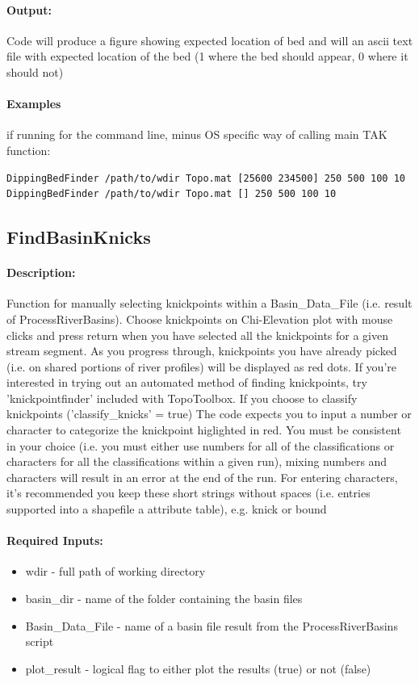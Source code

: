 \paragraph{Output:}
Code will produce a figure showing expected location of bed and will an ascii text file with expected location of the bed 
(1 where the bed should appear, 0 where it should not)

\paragraph{Examples} if running for the command line, minus OS specific way of calling main TAK function:
\begin{lstlisting}[language=bash]
DippingBedFinder /path/to/wdir Topo.mat [25600 234500] 250 500 100 10
DippingBedFinder /path/to/wdir Topo.mat [] 250 500 100 10   
\end{lstlisting}

\subsection{FindBasinKnicks}
\paragraph{Description:}
Function for manually selecting knickpoints within a Basin\_Data\_File (i.e. result of ProcessRiverBasins). 
Choose knickpoints on Chi-Elevation plot with mouse clicks and press return when you have selected
all the knickpoints for a given stream segment. As you progress through, knickpoints you have already picked 
(i.e. on shared portions of river profiles) will be displayed as red dots. If you're interested in trying out
an automated method of finding knickpoints, try 'knickpointfinder' included with TopoToolbox. If you choose to 
classify knickpoints ('classify\_knicks' = true) The code expects you to input a number or character 
to categorize the knickpoint higlighted in red. You must be consistent in your choice (i.e. you must either use 
numbers for all of the classifications or characters for all the classifications within a given run), mixing numbers 
and characters will result in an error at the end of the run. For entering characters, it's recommended you keep these 
short strings without spaces (i.e. entries supported into a shapefile a attribute table), e.g. knick or bound 

\paragraph{Required Inputs:}
\begin{itemize}
\item wdir - full path of working directory
\item basin\_dir - name of the folder containing the basin files
\item Basin\_Data\_File - name of a basin file result from the ProcessRiverBasins script
\item plot\_result - logical flag to either plot the results (true) or not (false) 
\end{itemize}

